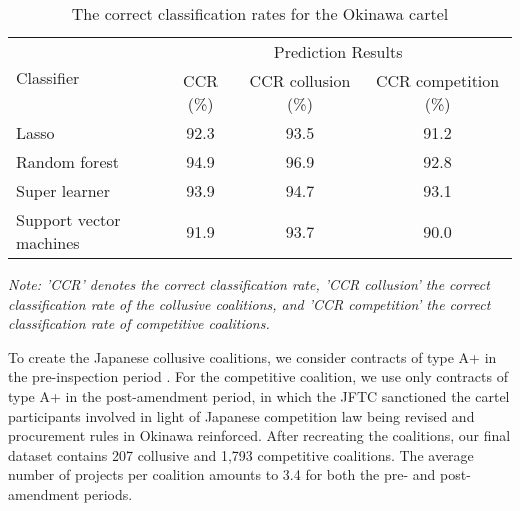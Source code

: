 \documentclass[a4paper,11pt]{article}
\begin{document}
	\begin{table}[ht]
		\caption{The correct classification rates for the Okinawa cartel}\label{CCRoki}
		\begin{center}
			\begin{tabular}{lccc}
				\hline
				\multirow{2}{*}{Classifier} & \multicolumn{3}{c}{Prediction Results}               \\ \cline{2-4} 
				& CCR (\%) & CCR collusion (\%) & CCR competition (\%) \\ \hline
				Lasso                       & 92.3    & 93.5              & 91.2                \\
				Random   forest             & 94.9    & 96.9              & 92.8                \\
				Super learner               & 93.9    & 94.7              & 93.1                \\
				Support   vector machines   & 91.9    & 93.7              & 90.0                \\ \hline
			\end{tabular}
		\end{center}
		\par
		\textit{Note: 'CCR' denotes the correct classification rate, 'CCR collusion' the correct classification rate of the collusive coalitions, and 'CCR competition' the correct classification rate of competitive coalitions.}
	\end{table}
	
	To create the Japanese collusive coalitions, we consider contracts of type A+ in the pre-inspection period \citep[see][for more details]{huber2020transnational}. For the competitive coalition, we use only contracts of type A+ in the post-amendment period, in which the JFTC sanctioned the cartel participants involved in light of Japanese competition law being revised and procurement rules in Okinawa reinforced. After recreating the coalitions, our final dataset contains 207 collusive and 1,793 competitive coalitions. The average number of projects per coalition amounts to 3.4 for both the pre- and post-amendment periods.
	
\end{document}
